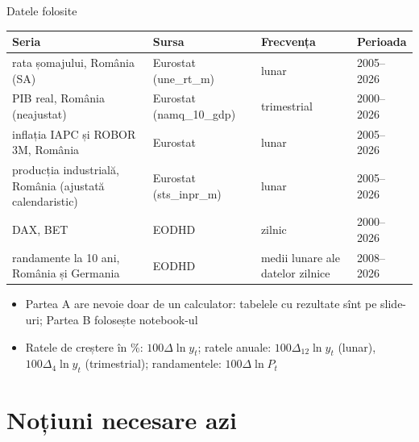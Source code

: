 \begin{frame}{Datele folosite}
\itemsize{\small}
\begin{center}
\footnotesize
\begin{tabular}{>{\raggedright\arraybackslash}p{4.4cm}>{\raggedright\arraybackslash}p{3.2cm}>{\raggedright\arraybackslash}p{2.6cm}l}
\toprule
\textbf{Seria} & \textbf{Sursa} & \textbf{Frecvența} & \textbf{Perioada} \\
\midrule
rata șomajului, România (SA) & Eurostat (une\_rt\_m) & lunar & 2005--2026 \\
PIB real, România (neajustat) & Eurostat (namq\_10\_gdp) & trimestrial & 2000--2026 \\
inflația IAPC și ROBOR 3M, România & Eurostat & lunar & 2005--2026 \\
producția industrială, România (ajustată calendaristic) & Eurostat (sts\_inpr\_m) & lunar & 2005--2026 \\
DAX, BET & EODHD & zilnic & 2000--2026 \\
randamente la 10 ani, România și Germania & EODHD & medii lunare ale datelor zilnice & 2008--2026 \\
\bottomrule
\end{tabular}
\end{center}
\begin{itemize}
    \item Partea A are nevoie doar de un calculator: tabelele cu rezultate sînt pe slide-uri; Partea B folosește notebook-ul
    \item Ratele de creștere în \%: $100\Delta\ln y_t$; ratele anuale: $100\Delta_{12}\ln y_t$ (lunar), $100\Delta_4\ln y_t$ (trimestrial); randamentele: $100\Delta\ln P_t$
\end{itemize}
\end{frame}


\section{Noțiuni necesare azi}

